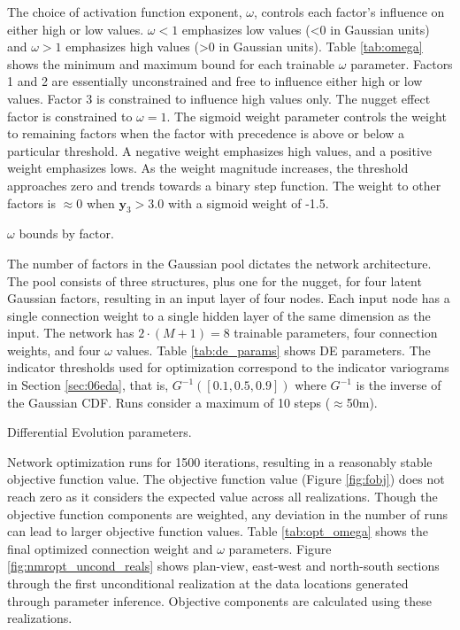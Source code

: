 The choice of activation function exponent, $\omega$, controls each factor's influence on either high or low values. $\omega < 1$ emphasizes low values (<0 in Gaussian units) and $\omega > 1$ emphasizes high values (>0 in Gaussian units). Table \ref{tab:omega} shows the minimum and maximum bound for each trainable $\omega$ parameter. Factors 1 and 2 are essentially unconstrained and free to influence either high or low values. Factor 3 is constrained to influence high values only. The nugget effect factor is constrained to $\omega=1$. The sigmoid weight parameter controls the weight to remaining factors when the factor with precedence is above or below a particular threshold. A negative weight emphasizes high values, and a positive weight emphasizes lows. As the weight magnitude increases, the threshold approaches zero and trends towards a binary step function. The weight to other factors is $\approx 0$ when $\mathbf{y}_{3} > 3.0$ with a sigmoid weight of -1.5.

\begin{table}[!htb]
    \centering
    \caption{$\omega$ bounds by factor.}
    \resizebox{0.9\width}{!}{}
    \label{tab:omega}
\end{table}

The number of factors in the Gaussian pool dictates the network architecture. The pool consists of three structures, plus one for the nugget, for four latent Gaussian factors, resulting in an input layer of four nodes. Each input node has a single connection weight to a single hidden layer of the same dimension as the input. The network has $2 \cdot (M+1) = 8$ trainable parameters, four connection weights, and four $\omega$ values. Table \ref{tab:de_params} shows \gls{DE} parameters. The indicator thresholds used for optimization correspond to the indicator variograms in Section \ref{sec:06eda}, that is, $G^{-1}([0.1, 0.5, 0.9])$ where $G^{-1}$ is the inverse of the Gaussian \gls{CDF}. Runs consider a maximum of 10 steps ($\approx$50m).

\begin{table}[!htb]
    \centering
    \caption{Differential Evolution parameters.}
    \resizebox{0.9\width}{!}{}
    \label{tab:de_params}
\end{table}

Network optimization runs for 1500 iterations, resulting in a reasonably stable objective function value. The objective function value (Figure \ref{fig:fobj}) does not reach zero as it considers the expected value across all realizations. Though the objective function components are weighted, any deviation in the number of runs can lead to larger objective function values. Table \ref{tab:opt_omega} shows the final optimized connection weight and  $\omega$ parameters. Figure \ref{fig:nmropt_uncond_reals} shows plan-view, east-west and north-south sections through the first unconditional realization at the data locations generated through parameter inference. Objective components are calculated using these realizations.

